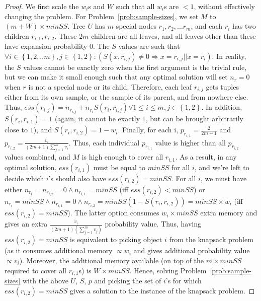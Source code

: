\documentclass[10pt,journal,compsoc]{IEEEtran}
\newcounter{prob}
\begin{document}
{\begin{proof}
We first scale the $w_i$s and $W$ such that all $w_i$s are $< 1$, without effectively changing the problem. For Problem~\ref{prob:sample-sizes}, we set $M$ to $(m + W) \times minSS$. Tree $U$ has $m$ special nodes $r_1, r_2, ... r_m$, and each $r_i$ has two children $r_{i,1}, r_{i,2}$. These $2m$ children are all leaves, and all leaves other than these have expansion probability $0$. 
The $S$ values are such that $\forall i \in \left\lbrace 1, 2, ..m\right\rbrace, j \in \left\lbrace 1, 2 \right\rbrace : (S(x, r_{i,j}) \neq 0 \Rightarrow x = r_{i,j} || x = r_i)$. In reality, the $S$ values cannot be exactly zero when the first argument is the trivial rule, but we can make it small enough such that any optimal solution will set $n_r = 0$ when $r$ is not a special node or its child. Therefore, each leaf $r_{i,j}$ gets tuples either from its own sample, or the sample of its parent, and from nowhere else. Thus, $ess(r_{i,j}) = n_{r_{i,j}} + n_{r_i}S(r_i, r_{i,j}) \forall 1 \leq i \leq m, j \in \left\lbrace 1,2 \right\rbrace$. In addition, $S(r_i, r_{i,1}) = 1$ (again, it cannot be exactly $1$, but can be brought arbitrarily close to $1$), and $S(r_i, r_{i,2}) = 1 - w_i$. Finally, for each i, $p_{r_{i,1}} = \frac{2}{2m+1}$ and $p_{r_{i,2}} = \frac{v_i}{(2m+1)\sum_{j=1}^{m}v_i}$. Thus, each individual $p_{r_{i,1}}$ value is higher than all $p_{r_{i,2}}$ values combined, and $M$ is high enough to cover all $r_{i,1}$. As a result, in any optimal solution, $ess(r_{i,1})$ must be equal to $minSS$ for all $i$, and we're left to decide which $i$'s should also have $ess(r_{i,2}) = minSS$. For all $i$, we must have either $n_{r_i} = n_{r_{i,2}} = 0 \land n_{r_{i,1}} = minSS$ (iff $ess(r_{i,2}) < minSS$) or $n_{r_i} = minSS \land n_{r_{i,1}} = 0 \land n_{r_{i,2}} = minSS (1 - S(r_i, r_{i,2})) = minSS \times w_i$ (iff $ess(r_{i,2}) = minSS$). The latter option consumes $w_i \times minSS$ extra memory and gives an extra $\frac{v_i}{(2m+1)(\sum_{j=1}^{m}v_j)}$ probability value. Thus, having $ess(r_{i,2}) = minSS$ is equivalent to picking object $i$ from the knapsack problem (as it consumes additional memory $\propto w_i$ and gives additional probability value $\propto v_i$). Moreover, the additional memory available (on top of the $m \times minSS$ required to cover all $r_{i,1}$s) is $W\times minSS$. Hence, solving Problem~\ref{prob:sample-sizes} with the above $U$, $S$, $p$ and picking the set of $i$'s for which $ess(r_{i,2}) = minSS$ gives a solution to the instance of the knapsack problem. 
\end{proof}
}
\end{document}

